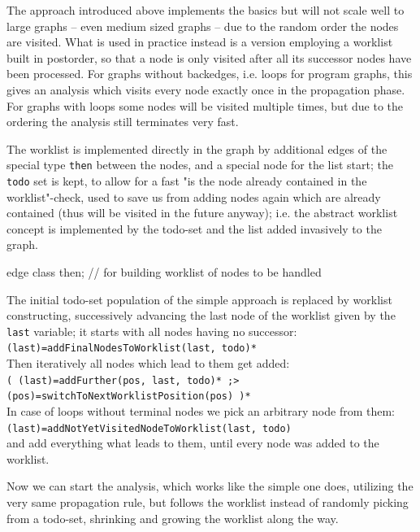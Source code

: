 The approach introduced above implements the basics but will not scale well to large graphs -- even medium sized graphs -- due to the random order the nodes are visited.
What is used in practice instead is a version employing a worklist built in postorder, so that a node is only visited after all its successor nodes have been processed.
For graphs without backedges, i.e. loops for program graphs, this gives an analysis which visits every node exactly once in the propagation phase.
For graphs with loops some nodes will be visited multiple times, but due to the ordering the analysis still terminates very fast.

The worklist is implemented directly in the graph by additional edges of the special type \verb#then# between the nodes, and a special node for the list start; the \verb#todo# set is kept, to allow for a fast "is the node already contained in the worklist"-check, used to save us from adding nodes again which are already contained (thus will be visited in the future anyway); i.e. the abstract worklist concept is implemented by the todo-set and the list added invasively to the graph.

  \begin{example}
    \begin{grgen}
edge class then; // for building worklist of nodes to be handled
    \end{grgen}
  \end{example}

\noindent The initial todo-set population of the simple approach is replaced by worklist constructing, successively advancing the last node of the worklist given by the \verb#last# variable; it starts with all nodes having no successor:\\
\verb#(last)=addFinalNodesToWorklist(last, todo)*#\\
Then iteratively all nodes which lead to them get added:\\
\verb#( (last)=addFurther(pos, last, todo)* ;> (pos)=switchToNextWorklistPosition(pos) )*#\\
In case of loops without terminal nodes we pick an arbitrary node from them:\\ \verb#(last)=addNotYetVisitedNodeToWorklist(last, todo)#\\
and add everything what leads to them, until every node was added to the worklist.

Now we can start the analysis, which works like the simple one does, utilizing the very same propagation rule, but follows the worklist instead of randomly picking from a todo-set, shrinking and growing the worklist along the way.

